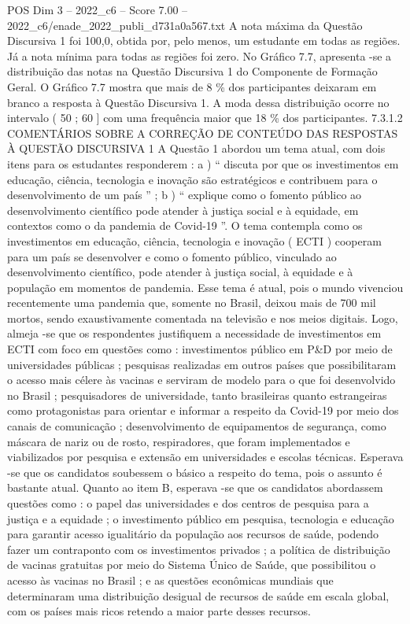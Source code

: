 \begin{textsample}{POS Dim 3 – 2022\_c6 – Score 7.00 – 2022\_c6/enade\_2022\_publi\_d731a0a567.txt}
A nota máxima da Questão Discursiva 1 foi 100,0, obtida por, pelo menos, um estudante em todas as regiões.
Já a nota mínima para todas as regiões foi zero.
No Gráfico 7.7, apresenta -se a distribuição das notas na Questão Discursiva 1 do Componente de Formação Geral.
O Gráfico 7.7 mostra que mais de 8 \% dos participantes deixaram em branco a resposta à Questão Discursiva 1.
A moda dessa distribuição ocorre no intervalo ( 50 ; 60 ] com uma frequência maior que 18 \% dos participantes. 7.3.1.2 COMENTÁRIOS SOBRE A CORREÇÃO DE CONTEÚDO DAS RESPOSTAS À QUESTÃO DISCURSIVA 1 A Questão 1 abordou um tema atual, com dois itens para os estudantes responderem : a ) “ discuta por que os investimentos em educação, ciência, tecnologia e inovação são estratégicos e contribuem para o desenvolvimento de um país ” ; b ) “ explique como o fomento público ao desenvolvimento científico pode atender à justiça social e à equidade, em contextos como o da pandemia de Covid-19 ”.
O tema contempla como os investimentos em educação, ciência, tecnologia e inovação ( ECTI ) cooperam para um país se desenvolver e como o fomento público, vinculado ao desenvolvimento científico, pode atender à justiça social, à equidade e à população em momentos de pandemia.
Esse tema é atual, pois o mundo vivenciou recentemente uma pandemia que, somente no Brasil, deixou mais de 700 mil mortos, sendo exaustivamente comentada na televisão e nos meios digitais.
Logo, almeja -se que os respondentes justifiquem a necessidade de investimentos em ECTI com foco em questões como : investimentos público em P\&D por meio de universidades públicas ; pesquisas realizadas em outros países que possibilitaram o acesso mais célere às vacinas e serviram de modelo para o que foi desenvolvido no Brasil ; pesquisadores de universidade, tanto brasileiras quanto estrangeiras como protagonistas para orientar e informar a respeito da Covid-19 por meio dos canais de comunicação ; desenvolvimento de equipamentos de segurança, como máscara de nariz ou de rosto, respiradores, que foram implementados e viabilizados por pesquisa e extensão em universidades e escolas técnicas.
Esperava -se que os candidatos soubessem o básico a respeito do tema, pois o assunto é bastante atual.
Quanto ao item B, esperava -se que os candidatos abordassem questões como : o papel das universidades e dos centros de pesquisa para a justiça e a equidade ; o investimento público em pesquisa, tecnologia e educação para garantir acesso igualitário da população aos recursos de saúde, podendo fazer um contraponto com os investimentos privados ; a política de distribuição de vacinas gratuitas por meio do Sistema Único de Saúde, que possibilitou o acesso às vacinas no Brasil ; e as questões econômicas mundiais que determinaram uma distribuição desigual de recursos de saúde em escala global, com os países mais ricos retendo a maior parte desses recursos.

\end{textsample}
